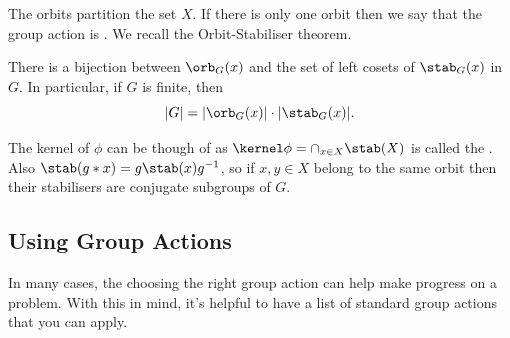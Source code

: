 \documentclass[a4paper]{scrartcl}
\begin{document}
The orbits partition the set $X$. If there is only one orbit then we say that the group action is .
We recall the Orbit-Stabiliser theorem.

\begin{theorem}
	There is a bijection between $\orb_G(x)$ and the set of left cosets of $\stab_G(x)$ in $G$. In particular, if $G$ is finite, then
	$$
	|G| = |\orb_G(x)| \cdot |\stab_G(x)|.
	$$
\end{theorem}

\begin{remark}
	The kernel of $\phi$ can be though of as $\kernel \phi = \cap_{x \in X} \stab(X)$ is called the .
	Also $\stab(g * x) = g \stab(x) g^{-1}$, so if $x, y \in X$ belong to the same orbit then their stabilisers are conjugate subgroups of $G$.
\end{remark}

\subsection{Using Group Actions}

In many cases, the choosing the right group action can help make progress on a problem. With this in mind, it's helpful to have a list of standard group actions that you can apply.
\end{document}
